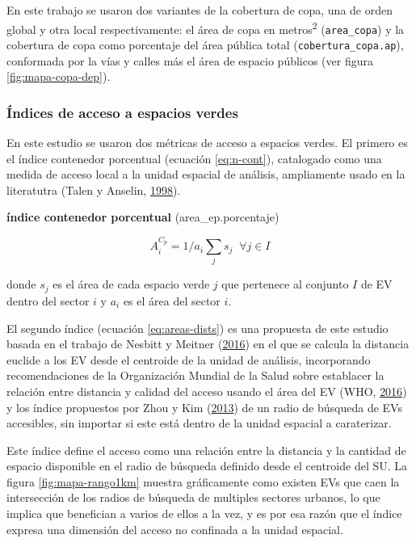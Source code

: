 \documentclass[12pt,a4paper,oneside, openany]{book}
\theoremstyle{definition}
\theoremstyle{definition}
\theoremstyle{definition}
\theoremstyle{remark}
\begin{document}
En este trabajo se usaron dos variantes de la cobertura de copa, una de
orden global y otra local respectivamente: el área de copa en
metros\textsuperscript{2} (\texttt{area\_copa}) y la cobertura de copa
como porcentaje del área pública total (\texttt{cobertura\_copa.ap}),
conformada por la vías y calles más el área de espacio públicos (ver
figura \ref{fig:mapa-copa-dep}).

\subsubsection{Índices de acceso a espacios
verdes}\label{uxedndices-de-acceso-a-espacios-verdes}

En este estudio se usaron dos métricas de acceso a espacios verdes. El
primero es el índice contenedor porcentual (ecuación \eqref{eq:n-cont}),
catalogado como una medida de acceso local a la unidad espacial de
análisis, ampliamente usado en la literatutra (Talen y Anselin,
\protect\hyperlink{ref-talen_assessing_1998}{1998}).

\textbf{índice contenedor porcentual} (area\_ep.porcentaje)

\begin{equation}
A^{C_p}_i =1/a_i\sum_j{s_j} \;  \; \forall  j \in I
\label{eq:n-cont}
\end{equation}

donde \(s_j\) es el área de cada espacio verde \(j\) que pertenece al
conjunto \(I\) de EV dentro del sector \(i\) y \(a_i\) es el área del
sector \(i\).

El segundo índice (ecuación \eqref{eq:areas-dists}) es una propuesta de
este estudio basada en el trabajo de Nesbitt y Meitner
(\protect\hyperlink{ref-nesbitt_exploring_2016}{2016}) en el que se
calcula la distancia euclide a los EV desde el centroide de la unidad de
análisis, incorporando recomendaciones de la Organización Mundial de la
Salud sobre establacer la relación entre distancia y calidad del acceso
usando el área del EV (WHO, \protect\hyperlink{ref-who2016urban}{2016})
y los índice propuestos por Zhou y Kim
(\protect\hyperlink{ref-zhou_social_2013}{2013}) de un radio de búsqueda
de EVs accesibles, sin importar si este está dentro de la unidad
espacial a caraterizar.

Este índice define el acceso como una relación entre la distancia y la
cantidad de espacio disponible en el radio de búsqueda definido desde el
centroide del SU. La figura \ref{fig:mapa-rango1km} muestra gráficamente
como existen EVs que caen la intersección de los radios de búsqueda de
multiples sectores urbanos, lo que implica que benefician a varios de
ellos a la vez, y es por esa razón que el índice expresa una dimensión
del acceso no confinada a la unidad espacial.
\end{document}
